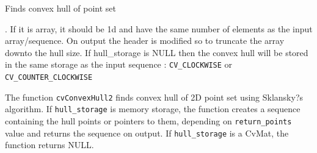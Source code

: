 \label{ConvexHull2}

Finds convex hull of point set


\begin{description}
. If it is array, it should be 1d and have the same number of elements as the input array/sequence. On output the header is modified so to truncate the array downto the hull size.  If hull\_storage is NULL then the convex hull will be stored in the same storage as the input sequence
: \texttt{CV\_CLOCKWISE} or \texttt{CV\_COUNTER\_CLOCKWISE}
\end{description}

The function \texttt{cvConvexHull2} finds convex hull of 2D point set using Sklansky?s algorithm. If \texttt{hull\_storage} is memory storage, the function creates a sequence containing the hull points or pointers to them, depending on \texttt{return\_points} value and returns the sequence on output.  If \texttt{hull\_storage} is a CvMat, the function returns NULL.

